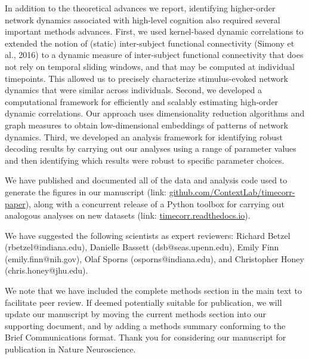 \documentclass[11pt,stdletter,orderfromtodate,sigleft]{newlfm}
\begin{document}
\begin{newlfm}
  In addition to the theoretical advances we report, identifying
  higher-order network dynamics associated with high-level cognition
  also required several important methods advances.  First, we used
  kernel-based dynamic correlations to extended the notion of (static)
  inter-subject functional connectivity (Simony et al., 2016) to a
  dynamic measure of inter-subject functional connectivity that does
  not rely on temporal sliding windows, and that may be computed at
  individual timepoints.  This allowed us to precisely characterize
  stimulus-evoked network dynamics that were similar across
  individuals.  Second, we developed a computational framework for
  efficiently and scalably estimating high-order dynamic correlations.
  Our approach uses dimensionality reduction algorithms and graph
  measures to obtain low-dimensional embeddings of patterns of network
  dynamics.  Third, we developed an analysis framework for identifying
  robust decoding results by carrying out our analyses using a range
  of parameter values and then identifying which results were robust
  to specific parameter choices.

  We have published and documented all of the data and analysis code
  used to generate the figures in our manuscript (link:
  \href{https://github.com/ContextLab/timecorr-paper}{github.com/ContextLab/timecorr-paper}),
  along with a concurrent release of a Python toolbox for carrying out
  analogous analyses on new datasets (link:
  \href{http://timecorr.readthedocs.io}{timecorr.readthedocs.io}).

  We have suggested the following scientists as expert reviewers:
  Richard Betzel (rbetzel@indiana.edu), Danielle Bassett (dsb@seas.upenn.edu), Emily Finn
  (emily.finn@nih.gov), Olaf Sporns (osporns@indiana.edu), and Christopher Honey (chris.honey@jhu.edu).

  We note that we have included the complete methods section in the
  main text to facilitate peer review.  If deemed potentially suitable
  for publication, we will update our manuscript by moving the current
  methods section into our supporting document, and by adding a
  methods summary conforming to the Brief Communications format.
  Thank you for considering our manuscript for publication in Nature
  Neuroscience.

\end{newlfm}
\end{document}
